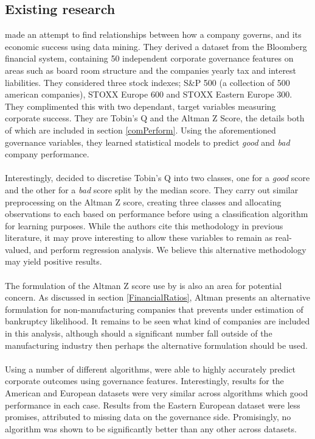 \subsection{Existing research}
{\cite{moldovan2015learning} made an attempt to find relationships between how a company governs, and its economic success using data mining. They derived a dataset from the Bloomberg financial system, containing 50 independent corporate governance features on areas such as board room structure and the  companies yearly tax and interest liabilities. They considered three stock indexes; S\&P 500 (a collection of 500 american companies), STOXX Europe 600 and STOXX Eastern Europe 300. They complimented this with two dependant, target variables measuring corporate success. They are Tobin's Q and the Altman Z Score, the details both of which are included in section \ref{comPerform}. Using the aforementioned governance variables, they learned statistical models to predict {\it good} and {\it bad} company performance.\\\\
Interestingly, \cite{moldovan2015learning} decided to discretise Tobin's Q into two classes, one for a {\it good} score and the other for a {\it bad} score split by the median score. They carry out similar preprocessing on the Altman Z score, creating three classes and allocating observations to each based on performance before using a classification algorithm for learning purposes. While the authors cite this methodology in previous literature, it may prove interesting to allow these variables to remain as real-valued, and perform regression analysis. We believe this alternative methodology may yield positive results. \\\\
The formulation of the Altman Z score use by \cite{moldovan2015learning} is also an area for potential concern. As discussed in section \ref{FinancialRatios}, Altman presents an alternative formulation for non-manufacturing companies that prevents under estimation of bankruptcy likelihood. It remains to be seen what kind of companies are included in this analysis, although should a significant number fall outside of the manufacturing industry then perhaps the alternative formulation should be used.   \\\\
Using a number of different algorithms, \cite{moldovan2015learning} were able to highly accurately predict corporate outcomes using governance features. Interestingly, results for the American and European datasets were very similar across algorithms which good performance in each case. Results from the Eastern European dataset were less promises, attributed to missing data on the governance side. Promisingly, no algorithm was shown to be significantly better than any other across datasets. \\\\
}
